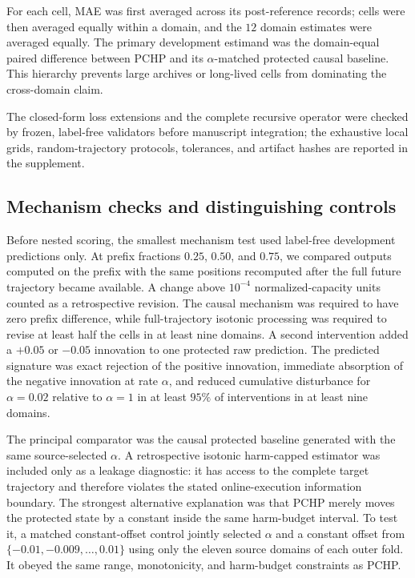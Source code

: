 \documentclass[preprint,12pt]{elsarticle}
\begin{document}
For each cell, MAE was first averaged across its post-reference records; cells were then averaged equally within a domain, and the $12$ domain estimates were averaged equally. The primary development estimand was the domain-equal paired difference between PCHP and its $\alpha$-matched protected causal baseline. This hierarchy prevents large archives or long-lived cells from dominating the cross-domain claim.

The closed-form loss extensions and the complete recursive operator were checked by frozen, label-free validators before manuscript integration; the exhaustive local grids, random-trajectory protocols, tolerances, and artifact hashes are reported in the supplement.

\subsection{Mechanism checks and distinguishing controls}

Before nested scoring, the smallest mechanism test used label-free development predictions only. At prefix fractions $0.25$, $0.50$, and $0.75$, we compared outputs computed on the prefix with the same positions recomputed after the full future trajectory became available. A change above $10^{-4}$ normalized-capacity units counted as a retrospective revision. The causal mechanism was required to have zero prefix difference, while full-trajectory isotonic processing was required to revise at least half the cells in at least nine domains. A second intervention added a $+0.05$ or $-0.05$ innovation to one protected raw prediction. The predicted signature was exact rejection of the positive innovation, immediate absorption of the negative innovation at rate $\alpha$, and reduced cumulative disturbance for $\alpha=0.02$ relative to $\alpha=1$ in at least $95\%$ of interventions in at least nine domains.

The principal comparator was the causal protected baseline generated with the same source-selected $\alpha$. A retrospective isotonic harm-capped estimator was included only as a leakage diagnostic: it has access to the complete target trajectory and therefore violates the stated online-execution information boundary. The strongest alternative explanation was that PCHP merely moves the protected state by a constant inside the same harm-budget interval. To test it, a matched constant-offset control jointly selected $\alpha$ and a constant offset from $\{-0.01,-0.009,\ldots,0.01\}$ using only the eleven source domains of each outer fold. It obeyed the same range, monotonicity, and harm-budget constraints as PCHP.
\end{document}
